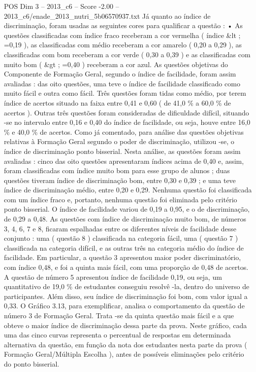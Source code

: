 \begin{textsample}{POS Dim 3 – 2013\_c6 – Score -2.00 – 2013\_c6/enade\_2013\_nutri\_5b06570937.txt}
Já quanto ao índice de discriminação, foram usadas as seguintes cores para qualificar a questão : • As questões classificadas com índice fraco receberam a cor vermelha ( índice \&lt ; =0,19 ), as classificadas com médio receberam a cor amarelo ( 0,20 a 0,29 ), as classificadas com bom receberam a cor verde ( 0,30 a 0,39 ) e as classificadas com muito bom ( \&gt ; =0,40 ) receberam a cor azul.
As questões objetivas do Componente de Formação Geral, segundo o índice de facilidade, foram assim avaliadas : das oito questões, uma teve o índice de facilidade classificado como muito fácil e outra como fácil.
Três questões foram tidas como médio, por terem índice de acertos situado na faixa entre 0,41 e 0,60 ( de 41,0 \% a 60,0 \% de acertos ).
Outras três questões foram consideradas de dificuldade difícil, situando -se no intervalo entre 0,16 e 0,40 do índice de facilidade, ou seja, houve entre 16,0 \% e 40,0 \% de acertos.
Como já comentado, para análise das questões objetivas relativas à Formação Geral segundo o poder de discriminação, utilizou -se, o índice de discriminação ponto bisserial.
Nesta análise, as questões foram assim avaliadas : cinco das oito questões apresentaram índices acima de 0,40 e, assim, foram classificadas com índice muito bom para esse grupo de alunos ; duas questões tiveram índice de discriminação bom, entre 0,30 e 0,39 ; e uma teve índice de discriminação médio, entre 0,20 e 0,29.
Nenhuma questão foi classificada com um índice fraco e, portanto, nenhuma questão foi eliminada pelo critério ponto bisserial.
O índice de facilidade variou de 0,19 a 0,95, e o de discriminação, de 0,29 a 0,48.
As questões com índice de discriminação muito bom, de números 3, 4, 6, 7 e 8, ficaram espalhadas entre os diferentes níveis de facilidade desse conjunto : uma ( questão 8 ) classificada na categoria fácil, uma ( questão 7 ) classificada na categoria difícil, e as outras três na categoria médio do índice de facilidade.
Em particular, a questão 3 apresentou maior poder discriminatório, com índice 0,48, e foi a quinta mais fácil, com uma proporção de 0,48 de acertos.
A questão de número 5 apresentou índice de facilidade 0,19, ou seja, um quantitativo de 19,0 \% de estudantes conseguiu resolvê -la, dentro do universo de participantes.
Além disso, seu índice de discriminação foi bom, com valor igual a 0,33.
O Gráfico 3.13, para exemplificar, analisa o comportamento da questão de número 3 de Formação Geral.
Trata -se da quinta questão mais fácil e a que obteve o maior índice de discriminação dessa parte da prova.
Neste gráfico, cada uma das cinco curvas representa o percentual de respostas em determinada alternativa da questão, em função da nota dos estudantes nesta parte da prova ( Formação Geral/Múltipla Escolha ), antes de possíveis eliminações pelo critério do ponto bisserial.

\end{textsample}

